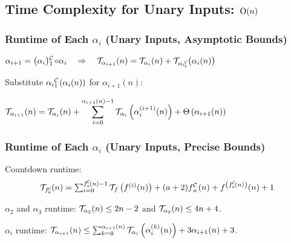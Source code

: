 \subsection{Time Complexity for Unary Inputs: $\text{O}(n)$}

\begin{frame}
\frametitle{Runtime of Each $\alpha_i$ (Unary Inputs, Asymptotic Bounds)}

$\displaystyle
\alpha_{i+1} = \cdt{\big(\alpha_i\big)}{1}\circ \alpha_i
\quad \implies \quad \runtime_{\alpha_{i+1}}(n) = \runtime_{\alpha_i}(n) + \runtime_{\cdt{\alpha_i}{1}}\big(\alpha_i(n)\big)
$

\smallskip
\pause 
{}

\bigskip

\pause 
Substitute $\cdt{\alpha_i}{1}(\alpha_i(n))$ for $\alpha_{i+1}(n)$:
\bigskip

$ \displaystyle 
\mathcal{T}_{\alpha_{i+1}}(n)
 = \mathcal{T}_{\alpha_i}(n) + 
 \sum_{i=0}^{\alpha_{i+1}(n) - 1} \mathcal{T}_{\alpha_i}\left(\alpha_i^{(i+1)}(n)\right) + \Theta\left(\alpha_{i+1}(n) \right)
$

\pause 
\smallskip
{}

\end{frame}


\begin{frame}
\frametitle{Runtime of Each $\alpha_i$ (Unary Inputs, Precise Bounds)}

Countdown runtime:
\begin{equation*}
\textstyle \runtime_{\cdt{f}{a}}(n) =
\sum_{i=0}^{\cdt{f}{a}(n) - 1} \runtime_f\left(f^{(i)}(n)\right)
+ (a + 2)\cdt{f}{a}(n) + f^{\left(\cdt{f}{a}(n)\right)}(n) + 1
\end{equation*}

\smallskip

\pause 
$\alpha_2$ and $\alpha_3$ runtime: $\mathcal{T}_{\alpha_2}(n) \le 2n - 2$ and $\mathcal{T}_{\alpha_3}(n) \le 4n + 4$.

\bigskip 

\pause 
$\alpha_i$ runtime: $
\textstyle \mathcal{T}_{\alpha_{i+1}}(n) \le \sum_{k=0}^{\alpha_{i+1}(n)}\mathcal{T}_{\alpha_i}\left( \alpha_i^{(k)}(n)\right) + 3\alpha_{i+1}(n) + 3$.

\bigskip

\pause 
{}

\end{frame}



